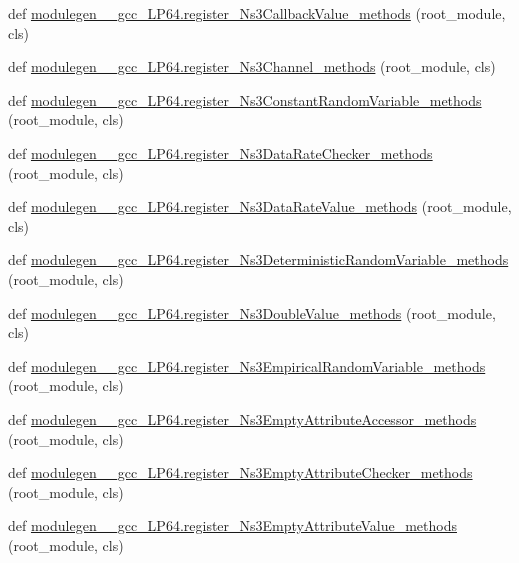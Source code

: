 \begin{DoxyCompactItemize}
\item 
def \hyperlink{namespacemodulegen____gcc__LP64_a08b703ec5906729a642f77b58b43c8d8}{modulegen\+\_\+\+\_\+gcc\+\_\+\+L\+P64.\+register\+\_\+\+Ns3\+Callback\+Value\+\_\+methods} (root\+\_\+module, cls)
\item 
def \hyperlink{namespacemodulegen____gcc__LP64_a8152d8ba5a6f1d5b869cf79767d9633e}{modulegen\+\_\+\+\_\+gcc\+\_\+\+L\+P64.\+register\+\_\+\+Ns3\+Channel\+\_\+methods} (root\+\_\+module, cls)
\item 
def \hyperlink{namespacemodulegen____gcc__LP64_a8d165075e9af75216b2620cd187d2f4e}{modulegen\+\_\+\+\_\+gcc\+\_\+\+L\+P64.\+register\+\_\+\+Ns3\+Constant\+Random\+Variable\+\_\+methods} (root\+\_\+module, cls)
\item 
def \hyperlink{namespacemodulegen____gcc__LP64_ab2f42b6063e5e94cdc2dc949e695869f}{modulegen\+\_\+\+\_\+gcc\+\_\+\+L\+P64.\+register\+\_\+\+Ns3\+Data\+Rate\+Checker\+\_\+methods} (root\+\_\+module, cls)
\item 
def \hyperlink{namespacemodulegen____gcc__LP64_a5a6db47983f455cd703998c947346f9a}{modulegen\+\_\+\+\_\+gcc\+\_\+\+L\+P64.\+register\+\_\+\+Ns3\+Data\+Rate\+Value\+\_\+methods} (root\+\_\+module, cls)
\item 
def \hyperlink{namespacemodulegen____gcc__LP64_a627e4424c53832709ec25ad4e541cec5}{modulegen\+\_\+\+\_\+gcc\+\_\+\+L\+P64.\+register\+\_\+\+Ns3\+Deterministic\+Random\+Variable\+\_\+methods} (root\+\_\+module, cls)
\item 
def \hyperlink{namespacemodulegen____gcc__LP64_aa85ace5d2bc740d08990445641c7b690}{modulegen\+\_\+\+\_\+gcc\+\_\+\+L\+P64.\+register\+\_\+\+Ns3\+Double\+Value\+\_\+methods} (root\+\_\+module, cls)
\item 
def \hyperlink{namespacemodulegen____gcc__LP64_a62433119796a27d3b8c284710fe975f9}{modulegen\+\_\+\+\_\+gcc\+\_\+\+L\+P64.\+register\+\_\+\+Ns3\+Empirical\+Random\+Variable\+\_\+methods} (root\+\_\+module, cls)
\item 
def \hyperlink{namespacemodulegen____gcc__LP64_a5885028edb9b0cbbdf4f75d1388d6b19}{modulegen\+\_\+\+\_\+gcc\+\_\+\+L\+P64.\+register\+\_\+\+Ns3\+Empty\+Attribute\+Accessor\+\_\+methods} (root\+\_\+module, cls)
\item 
def \hyperlink{namespacemodulegen____gcc__LP64_aa52eca018e0116d17b4c6c2798dcee71}{modulegen\+\_\+\+\_\+gcc\+\_\+\+L\+P64.\+register\+\_\+\+Ns3\+Empty\+Attribute\+Checker\+\_\+methods} (root\+\_\+module, cls)
\item 
def \hyperlink{namespacemodulegen____gcc__LP64_a86864e6a4eb56d909f7b4550592ead3b}{modulegen\+\_\+\+\_\+gcc\+\_\+\+L\+P64.\+register\+\_\+\+Ns3\+Empty\+Attribute\+Value\+\_\+methods} (root\+\_\+module, cls)

\end{DoxyCompactItemize}
